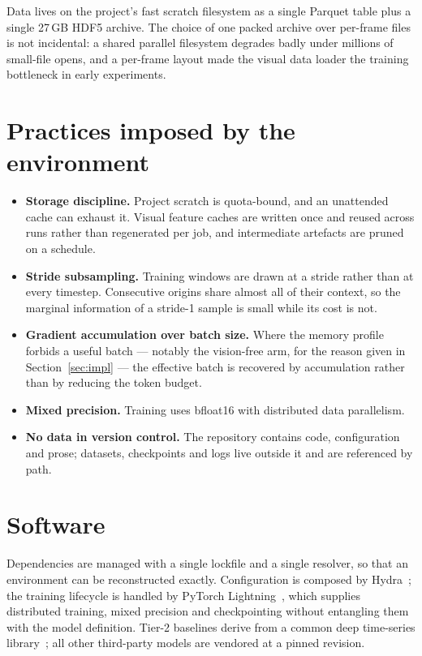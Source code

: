 Data lives on the project's fast scratch filesystem as a single Parquet table plus a single
27\,GB HDF5 archive. The choice of one packed archive over per-frame files is not incidental:
a shared parallel filesystem degrades badly under millions of small-file opens, and a
per-frame layout made the visual data loader the training bottleneck in early experiments.

\section{Practices imposed by the environment}

\begin{itemize}
  \item \textbf{Storage discipline.} Project scratch is quota-bound, and an unattended
    cache can exhaust it. Visual feature caches are written once and reused across runs
    rather than regenerated per job, and intermediate artefacts are pruned on a schedule.
  \item \textbf{Stride subsampling.} Training windows are drawn at a stride rather than at
    every timestep. Consecutive origins share almost all of their context, so the marginal
    information of a stride-1 sample is small while its cost is not.
  \item \textbf{Gradient accumulation over batch size.} Where the memory profile forbids a
    useful batch --- notably the vision-free arm, for the reason given in
    Section~\ref{sec:impl} --- the effective batch is recovered by accumulation rather than
    by reducing the token budget.
  \item \textbf{Mixed precision.} Training uses bfloat16 with distributed data parallelism.
  \item \textbf{No data in version control.} The repository contains code, configuration and
    prose; datasets, checkpoints and logs live outside it and are referenced by path.
\end{itemize}

\section{Software}

Dependencies are managed with a single lockfile and a single resolver, so that an environment
can be reconstructed exactly. Configuration is composed by Hydra~\cite{hydra}; the training
lifecycle is handled by PyTorch Lightning~\cite{lightning}, which supplies distributed
training, mixed precision and checkpointing without entangling them with the model definition.
Tier-2 baselines derive from a common deep time-series library~\cite{tslib}; all other
third-party models are vendored at a pinned revision.


